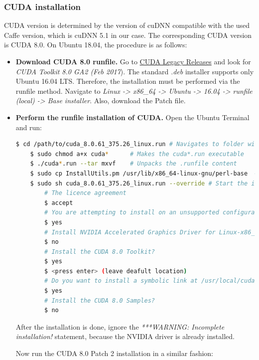 
\subsubsection{CUDA installation}

CUDA version is determined by the version of cuDNN compatible with the used Caffe version, which is cuDNN 5.1 in our case. The corresponding CUDA version is CUDA 8.0. On Ubuntu 18.04, the procedure is as follows: \cite{nvidia_dev}

\begin{itemize}
	\item \textbf{Download CUDA 8.0 runfile.} Go to \href{https://developer.nvidia.com/cuda-80-ga2-download-archive}{CUDA Legacy Releases} and look for \textit{CUDA Toolkit 8.0 GA2 (Feb 2017}). The standard \textit{.deb} installer supports only Ubuntu 16.04 LTS. Therefore, the installation must be performed via the runfile method. Navigate to \textit{Linux -> x86\_64 -> Ubuntu -> 16.04 -> runfile (local) -> Base installer}. Also, download the Patch file. 
	
	\item \textbf{Perform the runfile installation of CUDA.} Open the Ubuntu Terminal and run: \cite{nvidia_dev}
	
	\begin{lstlisting}[language=bash]
	$ cd /path/to/cuda_8.0.61_375.26_linux.run # Navigates to folder with CUDA
	$ sudo chmod a+x cuda*		# Makes the cuda*.run executable
	$ ./cuda*.run --tar mxvf 	# Unpacks the .runfile content
	$ sudo cp InstallUtils.pm /usr/lib/x86_64-linux-gnu/perl-base  # Copy one of the extracted files to perl-base
	$ sudo sh cuda_8.0.61_375.26_linux.run --override # Start the installation 
		# The licence agreement
		$ accept 
		# You are attempting to install on an unsupported configuration. Do you wish to continue?
		$ yes 
		# Install NVIDIA Accelerated Graphics Driver for Linux-x86_64 375.26?
		$ no
		# Install the CUDA 8.0 Toolkit?
		$ yes 
		$ <press enter> (leave deafult location)
		# Do you want to install a symbolic link at /usr/local/cuda?
		$ yes
		# Install the CUDA 8.0 Samples?
		$ no
	\end{lstlisting}
	
	After the installation is done, ignore the \textit{***WARNING: Incomplete installation!} statement, because the NVIDIA driver is already installed. 
	
	Now run the CUDA 8.0 Patch 2 installation in a similar fashion:
	

\end{itemize}
